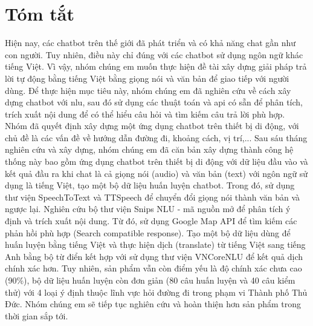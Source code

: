\chapter*{Tóm tắt}
\label{tomtat}
Hiện nay, các chatbot trên thế giới đã phát triển và có khả năng chat gần như con người. Tuy nhiên, điều này chỉ đúng với các chatbot sử dụng ngôn ngữ khác tiếng Việt. Vì vậy, nhóm chúng em muốn thực hiện đề tài xây dựng giải pháp trả lời tự động bằng tiếng Việt bằng giọng nói và văn bản để giao tiếp với người dùng. Để thực hiện mục tiêu này, nhóm chúng em đã nghiên cứu về cách xây dựng chatbot với \ac{nlu}, sau đó sử dụng các thuật toán và \ac{api} có sẵn để phân tích, trích xuất nội dung để có thể hiểu câu hỏi và tìm kiếm câu trả lời phù hợp. Nhóm đã quyết định xây dựng một ứng dụng chatbot trên thiết bị di động, với chủ đề là các vấn đề về hướng dẫn đường đi, khoảng cách, vị trí,... Sau sáu tháng nghiên cứu và xây dựng, nhóm chúng em đã căn bản xây dựng thành công hệ thống này bao gồm ứng dụng chatbot trên thiết bị di động với dữ liệu đầu vào và kết quả đầu ra khi chat là cả giọng nói (audio) và văn bản (text) với ngôn ngữ sử dụng là tiếng Việt, tạo một bộ dữ liệu huấn luyện chatbot. Trong đó, sử dụng thư viện SpeechToText\cite{stt} và TTSpeech\cite{tts} để chuyển đổi giọng nói thành văn bản và ngược lại. Nghiên cứu bộ thư viện Snips NLU\cite{Snipsnlu} - mã nguồn mở để phân tích ý định và trích xuất nội dung. Từ đó, sử dụng Google Map API\cite{ggmaps} để tìm kiếm các phản hồi phù hợp (Search compatible response). Tạo một bộ dữ liệu dùng để huấn luyện bằng tiếng Việt và thực hiện dịch (translate) từ tiếng Việt sang tiếng Anh bằng bộ từ điển kết hợp với sử dụng thư viện VNCoreNLU\cite{vncorenlu} để kết quả dịch chính xác hơn. Tuy nhiên, sản phẩm vẫn còn điểm yếu là độ chính xác chưa cao (90\%), bộ dữ liệu huấn luyện còn đơn giản (80 câu huấn luyện và 40 câu kiểm thử) với 4 loại ý định thuộc lĩnh vực hỏi đường đi trong phạm vi Thành phố Thủ Đức. Nhóm chúng em sẽ tiếp tục nghiên cứu và hoàn thiện hơn sản phẩm trong thời gian sắp tới. 
